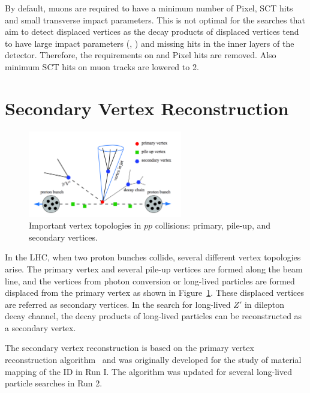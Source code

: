 By default, muons are required to have a minimum number of Pixel, SCT hits and small transverse impact parameters. This is not optimal for the searches that aim to detect displaced vertices as the decay products of displaced vertices tend to have large impact parameters (\dzero, \zzero) and missing hits in the inner layers of the detector. Therefore, the requirements on \dzero and Pixel hits are removed. Also minimum SCT hits on muon tracks are lowered to 2.

\section{Secondary Vertex Reconstruction}
\label{sec:reco:dv}

\begin{figure}[!htb]
    \includegraphics[width=0.6\textwidth]{figures/vertex.png}
    \centering
    \caption{Important vertex topologies in $pp$ collisions: primary, pile-up, and secondary vertices.}
    \label{fig:vertex_topology}
\end{figure}

In the LHC, when two proton bunches collide, several different vertex topologies arise. The primary vertex and several pile-up vertices are formed along the beam line, and the vertices from photon conversion or long-lived particles are formed displaced from the primary vertex as shown in Figure~\ref{fig:vertex_topology}. These displaced vertices are referred as secondary vertices. In the search for long-lived $Z'$ in dilepton decay channel, the decay products of long-lived particles can be reconstructed as a secondary vertex.

The secondary vertex reconstruction is based on the primary vertex reconstruction algorithm~\cite{1742-6596-119-3-032033} and was originally developed for the study of material mapping of the ID in Run I. The algorithm was updated for several long-lived particle searches in Run 2.


